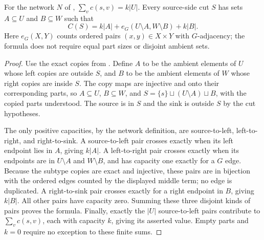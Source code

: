 \begin{lemma}
For the network $N$ of ,
$\sum_v c(s,v)=k|U|$. Every source-side cut $S$ has sets $A\subseteq U$
and $B\subseteq W$ such that
\[
 C(S)=k|A|+e_G(U\setminus A,W\setminus B)+k|B|.
\]
Here $e_G(X,Y)$ counts ordered pairs $(x,y)\in X\times Y$ with $G$-adjacency;
the formula does not require equal part sizes or disjoint ambient sets.
\end{lemma}
\begin{proof}
Use the exact copies from . Define $A$ to
be the ambient elements of $U$ whose left copies are outside $S$, and
$B$ to be the ambient elements of $W$ whose right copies are inside $S$.
The copy maps are injective and onto their corresponding parts, so
$A\subseteq U$, $B\subseteq W$, and
$S=\{s\}\sqcup(U\setminus A)\sqcup B$, with the copied parts understood.
The source is in $S$ and the sink is outside $S$ by the cut hypotheses.

The only positive capacities, by the network definition, are source-to-left,
left-to-right, and right-to-sink. A source-to-left pair crosses exactly
when its left endpoint lies in $A$, giving $k|A|$. A left-to-right pair
crosses exactly when its endpoints are in $U\setminus A$ and
$W\setminus B$, and has capacity one exactly for a $G$ edge. Because
the subtype copies are exact and injective, these pairs are in bijection
with the ordered edges counted by the displayed middle term; no edge
is duplicated. A right-to-sink pair crosses exactly for a right endpoint
in $B$, giving $k|B|$. All other pairs have capacity zero. Summing these
three disjoint kinds of pairs proves the formula. Finally, exactly the
$|U|$ source-to-left pairs contribute to $\sum_v c(s,v)$, each with
capacity $k$, giving its asserted value. Empty parts and $k=0$ require
no exception to these finite sums.
\end{proof}
